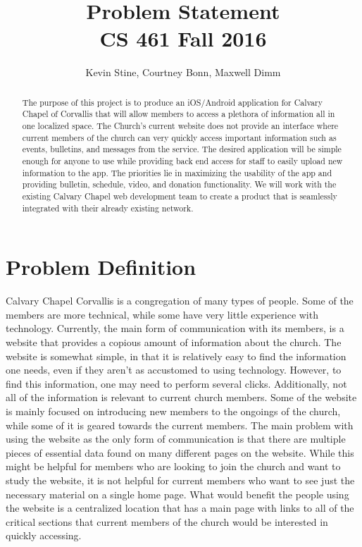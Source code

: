 \documentclass[letterpaper,10pt,draftclsnofoot,onecolumn,titlepage]{IEEEtran}
\def\name{Kevin Stine, Courtney Bonn, Maxwell Dimm}
\begin{document}
	\title{\huge Problem Statement \\ CS 461 Fall 2016}
	\author{\large \name}
	
	\maketitle
		\begin{abstract}The purpose of this project is to produce an iOS/Android application for Calvary Chapel of Corvallis that will allow members to access a plethora of information all in one localized space. 
		The Church's current website does not provide an interface where current members of the church can very quickly access important information such as events, bulletins, and messages from the service. 
		The desired application will be simple enough for anyone to use while providing back end access for staff to easily upload new information to the app. 
		The priorities lie in maximizing the usability of the app and providing bulletin, schedule, video, and donation functionality. 
		We will work with the existing Calvary Chapel web development team to create a product that is seamlessly integrated with their already existing network. 
		\end{abstract}
	
	\clearpage	
		
	\section*{Problem Definition}
	Calvary Chapel Corvallis is a congregation of many types of people.
	Some of the members are more technical, while some have very little experience with technology. 
	Currently, the main form of communication with its members, is a website that provides a copious amount of information about the church. 
	The website is somewhat simple, in that it is relatively easy to find the information one needs, even if they aren't as accustomed to using technology. 
	However, to find this information, one may need to perform several clicks. 
	Additionally, not all of the information is relevant to current church members. 
	Some of the website is mainly focused on introducing new members to the ongoings of the church, while some of it is geared towards the current members.
	The main problem with using the website as the only form of communication is that there are multiple pieces of essential data found on many different pages on the website.
	While this might be helpful for members who are looking to join the church and want to study the website, it is not helpful for current members who want to see just the necessary material on a single home page. 
	What would benefit the people using the website is a centralized location that has a main page with links to all of the critical sections that current members of the church would be interested in quickly accessing.
	
\end{document}
